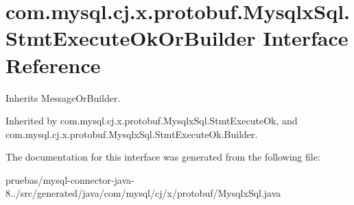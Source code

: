 \hypertarget{interfacecom_1_1mysql_1_1cj_1_1x_1_1protobuf_1_1_mysqlx_sql_1_1_stmt_execute_ok_or_builder}{}\section{com.\+mysql.\+cj.\+x.\+protobuf.\+Mysqlx\+Sql.\+Stmt\+Execute\+Ok\+Or\+Builder Interface Reference}
\label{interfacecom_1_1mysql_1_1cj_1_1x_1_1protobuf_1_1_mysqlx_sql_1_1_stmt_execute_ok_or_builder}


Inherits Message\+Or\+Builder.



Inherited by com.\+mysql.\+cj.\+x.\+protobuf.\+Mysqlx\+Sql.\+Stmt\+Execute\+Ok, and com.\+mysql.\+cj.\+x.\+protobuf.\+Mysqlx\+Sql.\+Stmt\+Execute\+Ok.\+Builder.



The documentation for this interface was generated from the following file\+:\begin{DoxyCompactItemize}
\item 
pruebas/mysql-\/connector-\/java-\/8../src/generated/java/com/mysql/cj/x/protobuf/Mysqlx\+Sql.\+java\end{DoxyCompactItemize}
